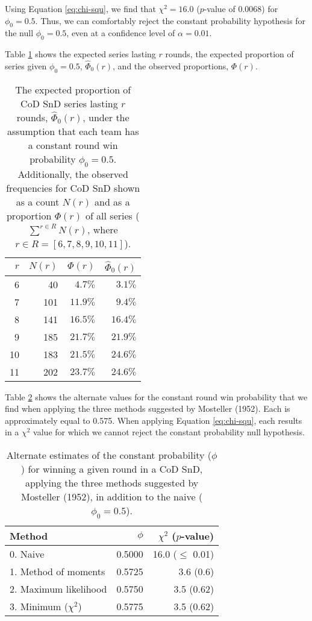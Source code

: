 \documentclass{article}
\begin{document}
Using Equation \ref{eq:chi-squ}, we find that \(\chi^2 = 16.0\)
(\(p\)-value of 0.0068) for \(\phi_0 = 0.5\). Thus, we can comfortably
reject the constant probability hypothesis for the null
\(\phi_0 = 0.5\), even at a confidence level of \(\alpha = 0.01\).

Table \ref{tbl:cod-prob-series-lasting-r-rounds} shows the expected
series lasting \(r\) rounds, the expected proportion of series given
\(\phi_0 = 0.5\), \(\hat{\Phi}_0(r)\), and the observed proportions,
\(\Phi(r)\).

\begin{longtable}{rrrr}
\caption{The expected proportion of CoD SnD series lasting $r$ rounds, $\hat{\Phi}_0(r)$, under the assumption that each team has a constant round win probability $\phi_0 = 0.5$. Additionally, the observed frequencies for CoD SnD shown as a count $N(r)$ and as a proportion $\Phi(r)$ of all series ($\sum^{r \in R} N(r)$, where $r \in R = [6, 7, 8, 9, 10, 11]$).}\label{tbl:cod-prob-series-lasting-r-rounds} \\
\toprule
$r$ & $N(r)$ & $\Phi(r)$ & $\hat{\Phi}_0(r)$ \\ 
\midrule
6 & 40 & $4.7\%$ & $3.1\%$ \\ 
7 & 101 & $11.9\%$ & $9.4\%$ \\ 
8 & 141 & $16.5\%$ & $16.4\%$ \\ 
9 & 185 & $21.7\%$ & $21.9\%$ \\ 
10 & 183 & $21.5\%$ & $24.6\%$ \\ 
11 & 202 & $23.7\%$ & $24.6\%$ \\ 
\bottomrule
\end{longtable}

Table \ref{tbl:mosteller-methods-results} shows the alternate values for
the constant round win probability that we find when applying the three
methods suggested by Mosteller (1952). Each is approximately equal to
0.575. When applying Equation \ref{eq:chi-squ}, each results in a
\(\chi^2\) value for which we cannot reject the constant probability
null hypothesis.

\begin{longtable}{lrr}
\caption{Alternate estimates of the constant probability ($\phi$) for winning a given round in a CoD SnD, applying the three methods suggested by Mosteller (1952), in addition to the naive ($\phi_0 = 0.5$).}\label{tbl:mosteller-methods-results} \\
\toprule
Method & $\phi$ & $\chi^2$ ($p$-value) \\
\midrule
0. Naive & 0.5000 & 16.0 ($\leq$ 0.01) \\
1. Method of moments & 0.5725 & 3.6 (0.6) \\
2. Maximum likelihood & 0.5750 & 3.5 (0.62) \\
3. Minimum ($\chi^2$) & 0.5775 & 3.5 (0.62) \\
\bottomrule
\end{longtable}
\end{document}
